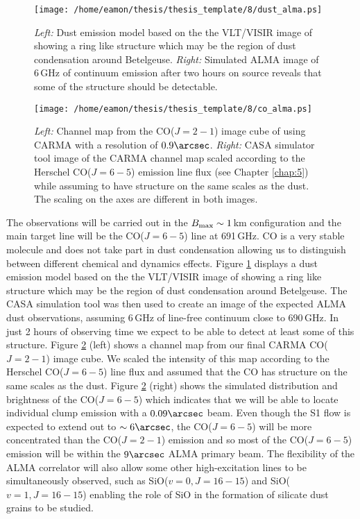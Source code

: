 \begin{figure}[!ht]
\centering 
        \texttt{[image: /home/eamon/thesis/thesis\_template/8/dust\_alma.ps]}
\caption[Simulating ALMA dust observations]{\textit{Left:} Dust emission model based on the the VLT/VISIR image of \cite{kervella_2011} showing a ring like structure which may be the region of dust condensation around Betelgeuse. \textit{Right:} Simulated ALMA image of 6\,GHz of continuum emission after two hours on source reveals that some of the structure should be detectable. }
\label{fig:8.1}
\end{figure}

\begin{figure}[!ht]
\centering 
        \texttt{[image: /home/eamon/thesis/thesis\_template/8/co\_alma.ps]}
\caption[Simulating ALMA CO(J=6-5) observations]{\textit{Left:} Channel map from the CO($J=2-1$) image cube of \cite{ogorman_2012} using CARMA with a resolution of $0.9\arcsec$. \textit{Right:} CASA simulator tool image of the CARMA channel map scaled according to the Herschel CO($J=6-5$) emission line flux (see Chapter \ref{chap:5}) while assuming to have structure on the same scales as the dust. The scaling on the axes are different in both images.} 
\label{fig:8.2}
\end{figure}

The observations will be carried out in the $B_{\rm{max}} \sim 1\,$km configuration and the main target line will be the CO($J=6-5$) line at 691\,GHz. CO is a very stable molecule and does not take part in dust condensation allowing us to distinguish between different chemical and dynamics effects. Figure \ref{fig:8.1} displays a dust emission model based on the the VLT/VISIR image of \cite{kervella_2011} showing a ring like structure which may be the region of dust condensation around Betelgeuse. The CASA simulation tool was then used to create an image of the expected ALMA dust observations, assuming 6\,GHz of line-free continuum close to 690\,GHz. In just 2 hours of observing time we expect to be able to detect at least some of this structure. Figure \ref{fig:8.2} (left) shows a channel map from our final CARMA CO($J=2-1$) image cube. We scaled the intensity of this map according to the Herschel CO($J=6-5$) line flux and assumed that the CO has structure on the same scales as the dust. Figure \ref{fig:8.2} (right) shows the simulated distribution and brightness of the CO($J=6-5$) which indicates that we will be able to locate individual clump emission with a $0.09\arcsec$ beam. Even though the S1 flow is expected to extend out to $\sim 6\arcsec$, the CO($J=6-5$) will be more concentrated than the CO($J=2-1$) emission and so most of the  CO($J=6-5$) emission will be within the $9\arcsec$ ALMA primary beam. The flexibility of the ALMA correlator will also allow some other high-excitation lines to be simultaneously observed, such as SiO($v=0, J=16-15$) and SiO($v=1,J=16-15$) enabling the role of SiO in the formation of silicate dust grains to be studied. 

